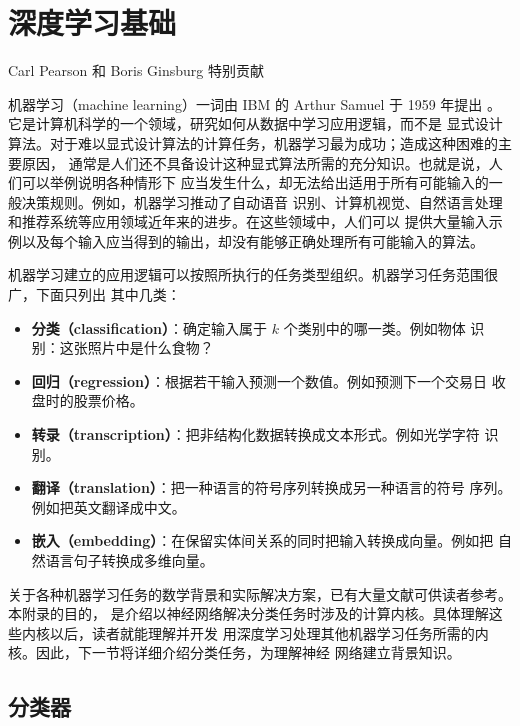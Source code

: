 \chapter{深度学习基础}
\chaptercontents
\label{app:deep-learning-basics}

\begin{center}
  \small Carl Pearson 和 Boris Ginsburg 特别贡献
\end{center}

机器学习（machine learning）一词由 IBM 的 Arthur Samuel 于 1959 年提出
\cite{appb-samuel}。它是计算机科学的一个领域，研究如何从数据中学习应用逻辑，而不是
显式设计算法。对于难以显式设计算法的计算任务，机器学习最为成功；造成这种困难的主要原因，
通常是人们还不具备设计这种显式算法所需的充分知识。也就是说，人们可以举例说明各种情形下
应当发生什么，却无法给出适用于所有可能输入的一般决策规则。例如，机器学习推动了自动语音
识别、计算机视觉、自然语言处理和推荐系统等应用领域近年来的进步。在这些领域中，人们可以
提供大量输入示例以及每个输入应当得到的输出，却没有能够正确处理所有可能输入的算法。

机器学习建立的应用逻辑可以按照所执行的任务类型组织。机器学习任务范围很广，下面只列出
其中几类：
\begin{itemize}
  \item \textbf{分类（classification）}：确定输入属于 $k$ 个类别中的哪一类。例如物体
  识别：这张照片中是什么食物？
  \item \textbf{回归（regression）}：根据若干输入预测一个数值。例如预测下一个交易日
  收盘时的股票价格。
  \item \textbf{转录（transcription）}：把非结构化数据转换成文本形式。例如光学字符
  识别。
  \item \textbf{翻译（translation）}：把一种语言的符号序列转换成另一种语言的符号
  序列。例如把英文翻译成中文。
  \item \textbf{嵌入（embedding）}：在保留实体间关系的同时把输入转换成向量。例如把
  自然语言句子转换成多维向量。
\end{itemize}

关于各种机器学习任务的数学背景和实际解决方案，已有大量文献可供读者参考。本附录的目的，
是介绍以神经网络解决分类任务时涉及的计算内核。具体理解这些内核以后，读者就能理解并开发
用深度学习处理其他机器学习任务所需的内核。因此，下一节将详细介绍分类任务，为理解神经
网络建立背景知识。

\section{分类器}
\label{sec:appb-classifiers}

